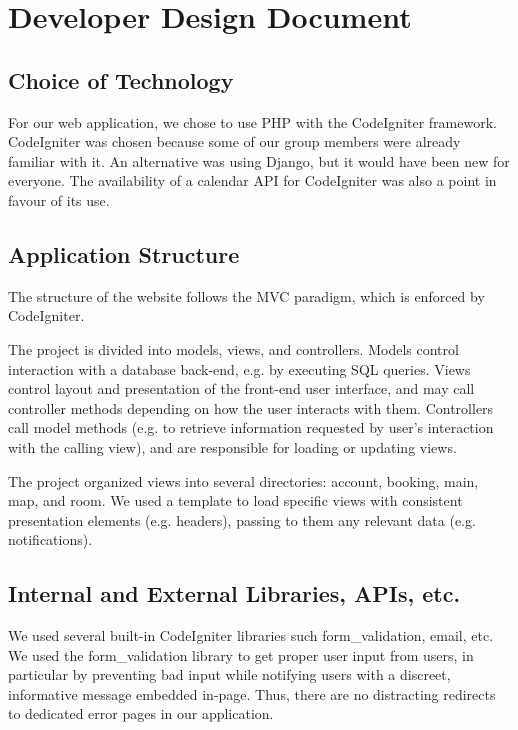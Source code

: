 \documentclass[12pt]{article}
\begin{document}
\section{Developer Design Document}


\subsection{Choice of Technology}

For our web application, we chose to use PHP with the CodeIgniter framework. CodeIgniter was chosen because some of our group members were already familiar with it. An alternative was using Django, but it would have been new for everyone. The availability of a calendar API for CodeIgniter was also a point in favour of its use.


\subsection{Application Structure}

The structure of the website follows the MVC paradigm, which is enforced by CodeIgniter.

The project is divided into models, views, and controllers. Models control interaction with a database back-end, e.g. by executing SQL queries. Views control layout and presentation of the front-end user interface, and may call controller methods depending on how the user interacts with them. Controllers call model methods (e.g. to retrieve information requested by user's interaction with the calling view), and are responsible for loading or updating views.

The project organized views into several directories: account, booking, main, map, and room. We used a template to load specific views with consistent presentation elements (e.g. headers), passing to them any relevant data (e.g. notifications).


\subsection{Internal and External Libraries, APIs, etc.}

We used several built-in CodeIgniter libraries such form_validation, email, etc. We used the form_validation library to get proper user input from users, in particular by preventing bad input while notifying users with a discreet, informative message embedded in-page. Thus, there are no distracting redirects to dedicated error pages in our application.
\end{document}
